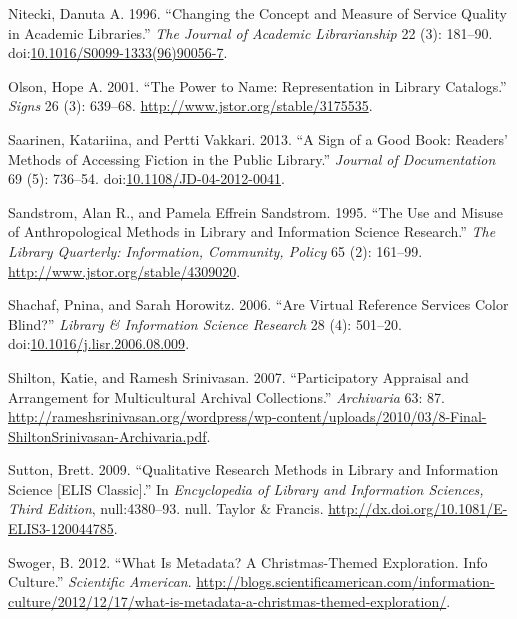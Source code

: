 \documentclass[]{article}
\begin{document}
\hypertarget{ref-niteckiux5fchangingux5f1996}{}
Nitecki, Danuta A. 1996. ``Changing the Concept and Measure of Service
Quality in Academic Libraries.'' \emph{The Journal of Academic
Librarianship} 22 (3): 181--90.
doi:\href{https://doi.org/10.1016/S0099-1333(96)90056-7}{10.1016/S0099-1333(96)90056-7}.

\hypertarget{ref-olsonux5fpowerux5f2001}{}
Olson, Hope A. 2001. ``The Power to Name: Representation in Library
Catalogs.'' \emph{Signs} 26 (3): 639--68.
\url{http://www.jstor.org/stable/3175535}.

\hypertarget{ref-saarinenux5fsignux5f2013}{}
Saarinen, Katariina, and Pertti Vakkari. 2013. ``A Sign of a Good Book:
Readers' Methods of Accessing Fiction in the Public Library.''
\emph{Journal of Documentation} 69 (5): 736--54.
doi:\href{https://doi.org/10.1108/JD-04-2012-0041}{10.1108/JD-04-2012-0041}.

\hypertarget{ref-sandstromux5fuseux5f1995}{}
Sandstrom, Alan R., and Pamela Effrein Sandstrom. 1995. ``The Use and
Misuse of Anthropological Methods in Library and Information Science
Research.'' \emph{The Library Quarterly: Information, Community, Policy}
65 (2): 161--99. \url{http://www.jstor.org/stable/4309020}.

\hypertarget{ref-shachafux5fareux5f2006}{}
Shachaf, Pnina, and Sarah Horowitz. 2006. ``Are Virtual Reference
Services Color Blind?'' \emph{Library \& Information Science Research}
28 (4): 501--20.
doi:\href{https://doi.org/10.1016/j.lisr.2006.08.009}{10.1016/j.lisr.2006.08.009}.

\hypertarget{ref-shiltonux5fparticipatoryux5f2007}{}
Shilton, Katie, and Ramesh Srinivasan. 2007. ``Participatory Appraisal
and Arrangement for Multicultural Archival Collections.''
\emph{Archivaria} 63: 87.
\url{http://rameshsrinivasan.org/wordpress/wp-content/uploads/2010/03/8-Final-ShiltonSrinivasan-Archivaria.pdf}.

\hypertarget{ref-suttonux5fqualitativeux5f2009}{}
Sutton, Brett. 2009. ``Qualitative Research Methods in Library and
Information Science {[}ELIS Classic{]}.'' In \emph{Encyclopedia of
Library and Information Sciences, Third Edition}, null:4380--93. null.
Taylor \& Francis. \url{http://dx.doi.org/10.1081/E-ELIS3-120044785}.

\hypertarget{ref-swogerux5fwhatux5f2012}{}
Swoger, B. 2012. ``What Is Metadata? A Christmas-Themed Exploration.
Info Culture.'' \emph{Scientific American}.
\href{http://blogs.scientificamerican.com/information-\%20culture/2012/12/17/what-is-metadata-a-christmas-themed-exploration/}{http://blogs.scientificamerican.com/information- culture/2012/12/17/what-is-metadata-a-christmas-themed-exploration/}.
\end{document}
